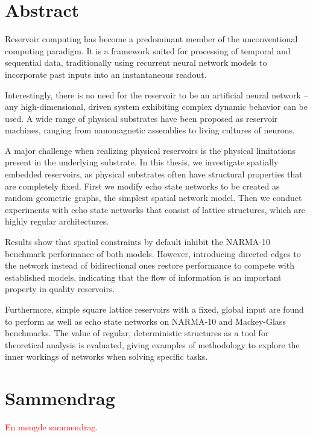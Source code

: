 \chapter*{Abstract}

Reservoir computing has become a predominant member of the unconventional
computing paradigm. It is a framework suited for processing of temporal and
sequential data, traditionally using recurrent neural network models to
incorporate past inputs into an instantaneous readout.

Interestingly, there is no need for the reservoir to be an artificial neural
network -- any high-dimensional, driven system exhibiting complex dynamic
behavior can be used. A wide range of physical substrates have been proposed as
reservoir machines, ranging from nanomagnetic assemblies to living cultures of
neurons.

A major challenge when realizing physical reservoirs is the physical limitations
present in the underlying substrate. In this thesis, we investigate spatially
embedded reservoirs, as physical substrates often have structural properties
that are completely fixed. First we modify echo state networks to be created as
random geometric graphs, the simplest spatial network model. Then we conduct
experiments with echo state networks that consist of lattice structures, which
are highly regular architectures.

Results show that spatial constraints by default inhibit the NARMA-10 benchmark
performance of both models. However, introducing directed edges to the network
instead of bidirectional ones restore performance to compete with established
models, indicating that the flow of information is an important property in
quality reservoirs.

Furthermore, simple square lattice reservoirs with a fixed, global input are
found to perform as well as echo state networks on NARMA-10 and Mackey-Glass
benchmarks. The value of regular, deterministic structures as a tool for
theoretical analysis is evaluated, giving examples of methodology to explore the
inner workings of networks when solving specific tasks.

\chapter*{Sammendrag}

\textcolor{red}{
  En mengde sammendrag.
}

